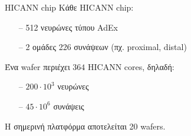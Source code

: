 \documentclass[11pt,center]{beamer}
\begin{document}
	\begin{frame} {HICANN chip}
		Κάθε HICANN chip:
		\begin{itemize}
			\item[--] 512 νευρώνες τύπου AdEx
			\item[--] 2 ομάδες 226 συνάψεων (πχ. proximal, distal)
		\end{itemize}
		\pause
		\vfill
		Ένα wafer περιέχει $364$ HICANN cores, δηλαδή:
		\begin{itemize}
			\item[--] $200\cdot 10^3$ νευρώνες
			\item[--]$45\cdot 10^6$ συνάψεις
		\end{itemize}
		\pause
		\vfill
		Η σημερινή πλατφόρμα αποτελείται 20 wafers.

	\end{frame}
\end{document}
